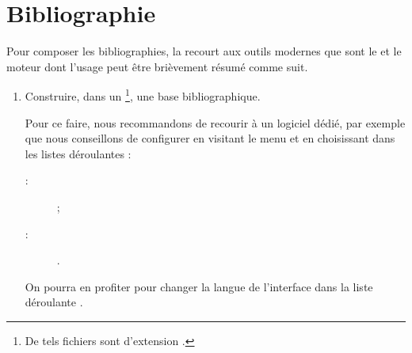 \documentclass[french,nolocaltoc]{nwejmart}
\newtheorem[style=definition]{fait}
\newtheorem[title=expérience]{experience}
\newtheorem[title-plural=anneaux]{anneau}
\newtheorem[title=idéal,title-plural=idéaux]{ideal}
\begin{document}
\section{Bibliographie}
\label{sec-bibliographie}

Pour composer les bibliographies, la \nwejmauthorcl{} recourt aux outils
modernes que sont le  et le moteur  dont
l'usage peut être brièvement résumé comme suit\autocite[Pour plus de détails,
cf. par exemple][en français]{Bitouze}.
\begin{enumerate}
\item Construire, dans un \footnote{De tels
    fichiers sont d'extension .}, une base bibliographique.

  Pour ce faire, nous recommandons de recourir à un logiciel dédié, par exemple
  \href{http://jabref.sourceforge.net/}{} que nous conseillons
  de configurer en visitant le menu
   et en choisissant dans les listes
  déroulantes :
  \begin{description}
  \item[ :]  ;
  \item[ :] .
  \end{description}
  On pourra en profiter pour changer la langue de l'interface dans la liste
  déroulante .


\end{enumerate}
\end{document}
